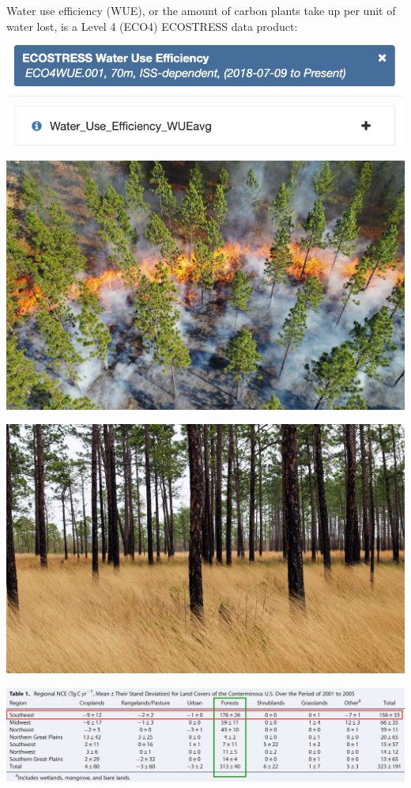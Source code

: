 \documentclass[oneside,a4paper,11pt,explicit]{book}
\begin{document}
Water use efficiency (WUE), or the amount of carbon plants take up per unit of water lost, is a Level 4 (ECO4) ECOSTRESS data product:

\vspace{.5em}

\centerline{\includegraphics[width=.6\textwidth]{WUEecostress.png}}


\begin{tcolorbox}[colback=yellow!5!white,colframe=IceCreamLeaf,title=\textbf{Southern Pine Forests}]
	\begin{multicols}{2}

	\centerline{\includegraphics[width=.975\columnwidth]{SPineBurn.jpeg}}
	\centerline{\includegraphics[width=.975\columnwidth]{SPineGrass.jpg}}
	\centerline{\includegraphics[width=.975\columnwidth]{CarbonForestUSRegions.png}}


\end{multicols}
\end{tcolorbox}
\end{document}
